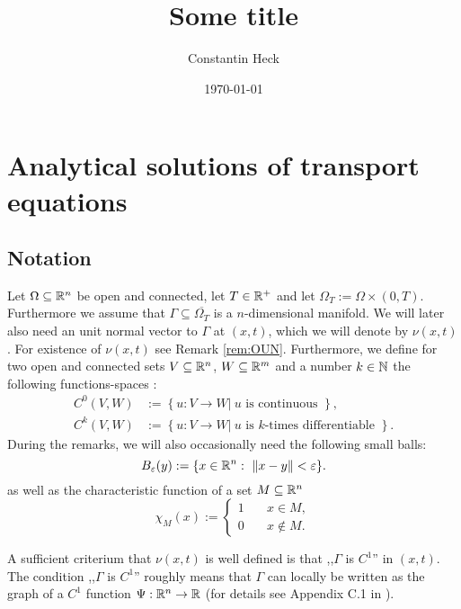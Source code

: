 \documentclass[paper=a4, fontsize=12pt,parskip=half,draft,headings=small]{scrartcl}
\title{Some title}
\author{Constantin Heck}
\date{\today}
\begin{document}

	
	\section{Analytical solutions of transport equations}
	\subsection{Notation}
		Let $\Omega \subseteq \mathbb{R}^n$ be open and connected, let $T \in \mathbb{R}^+$ and let $\Omega_T:= \Omega\times (0,T)$.
		Furthermore we assume that $\Gamma \subseteq \overline{\Omega_T}$ is a $n$-dimensional manifold.
		We will later also need an unit normal vector to $\Gamma$ at $(x,t)$, which we will denote by $\nu(x,t)$.
		For existence of $\nu(x,t)$ see Remark \ref{rem:OUN}.
		Furthermore, we define for two open and connected sets $V \subseteq \mathbb{R}^n$, $W \subseteq \mathbb{R}^m$ and a number $k \in \mathbb{N}$ the following functions-spaces :
		\begin{align*}
			C^0(V,W)&:= \left\{ u: V \to W \vert \ \text{$u$ is continuous }\right\},\\
			C^k(V,W)&:= \left\{ u: V \to W \vert \ \text{$u$ is $k$-times differentiable }\right\}.
		\end{align*}		
		During the remarks, we will also occasionally need the following small balls:
		\[
			B_\varepsilon(y):=\{ x \in \mathbb{R}^n: \ \Vert x-y\Vert<\varepsilon \}.
		\]
		as well as the characteristic function of a set $M\subseteq \mathbb{R}^n$
		\[
			\chi_M(x):=
			\begin{cases}
				1  \quad &x \in M,\\
				0 & x \notin M.
			\end{cases}
		\]
		\begin{remark}\label{rem:OUN}
			A sufficient criterium that $\nu(x,t)$ is well defined is that ,,$\Gamma$ is $C^1$'' in $(x,t)$. 
			The condition ,,$\Gamma$ is $C^1$'' roughly means that $\Gamma$ can locally be written as the graph of a $C^1$ function $\Psi:\mathbb{R}^n \to \mathbb{R}$ (for details see Appendix C.1 in \cite{Evans98}).
		\end{remark}
		
\end{document}
